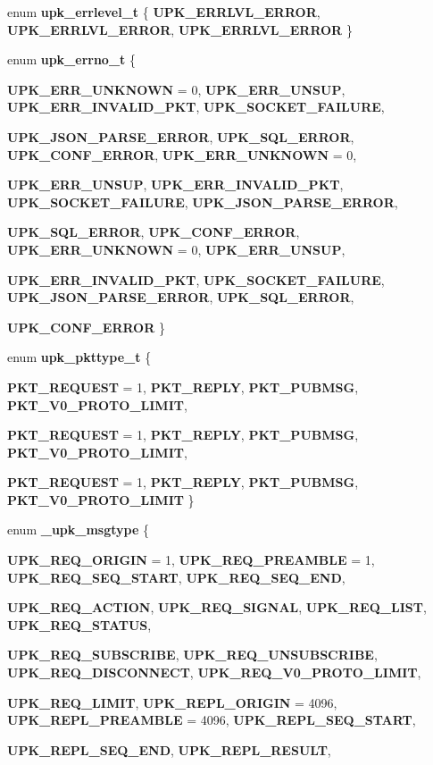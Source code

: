 \begin{DoxyCompactItemize}
enum {\bf upk\_\-errlevel\_\-t} \{ {\bf UPK\_\-ERRLVL\_\-ERROR}, 
{\bf UPK\_\-ERRLVL\_\-ERROR}, 
{\bf UPK\_\-ERRLVL\_\-ERROR}
 \}
\item 
enum {\bf upk\_\-errno\_\-t} \{ \par
{\bf UPK\_\-ERR\_\-UNKNOWN} =  0, 
{\bf UPK\_\-ERR\_\-UNSUP}, 
{\bf UPK\_\-ERR\_\-INVALID\_\-PKT}, 
{\bf UPK\_\-SOCKET\_\-FAILURE}, 
\par
{\bf UPK\_\-JSON\_\-PARSE\_\-ERROR}, 
{\bf UPK\_\-SQL\_\-ERROR}, 
{\bf UPK\_\-CONF\_\-ERROR}, 
{\bf UPK\_\-ERR\_\-UNKNOWN} =  0, 
\par
{\bf UPK\_\-ERR\_\-UNSUP}, 
{\bf UPK\_\-ERR\_\-INVALID\_\-PKT}, 
{\bf UPK\_\-SOCKET\_\-FAILURE}, 
{\bf UPK\_\-JSON\_\-PARSE\_\-ERROR}, 
\par
{\bf UPK\_\-SQL\_\-ERROR}, 
{\bf UPK\_\-CONF\_\-ERROR}, 
{\bf UPK\_\-ERR\_\-UNKNOWN} =  0, 
{\bf UPK\_\-ERR\_\-UNSUP}, 
\par
{\bf UPK\_\-ERR\_\-INVALID\_\-PKT}, 
{\bf UPK\_\-SOCKET\_\-FAILURE}, 
{\bf UPK\_\-JSON\_\-PARSE\_\-ERROR}, 
{\bf UPK\_\-SQL\_\-ERROR}, 
\par
{\bf UPK\_\-CONF\_\-ERROR}
 \}
\item 
enum {\bf upk\_\-pkttype\_\-t} \{ \par
{\bf PKT\_\-REQUEST} =  1, 
{\bf PKT\_\-REPLY}, 
{\bf PKT\_\-PUBMSG}, 
{\bf PKT\_\-V0\_\-PROTO\_\-LIMIT}, 
\par
{\bf PKT\_\-REQUEST} =  1, 
{\bf PKT\_\-REPLY}, 
{\bf PKT\_\-PUBMSG}, 
{\bf PKT\_\-V0\_\-PROTO\_\-LIMIT}, 
\par
{\bf PKT\_\-REQUEST} =  1, 
{\bf PKT\_\-REPLY}, 
{\bf PKT\_\-PUBMSG}, 
{\bf PKT\_\-V0\_\-PROTO\_\-LIMIT}
 \}
\item 
enum {\bf \_\-upk\_\-msgtype} \{ \par
{\bf UPK\_\-REQ\_\-ORIGIN} =  1, 
{\bf UPK\_\-REQ\_\-PREAMBLE} =  1, 
{\bf UPK\_\-REQ\_\-SEQ\_\-START}, 
{\bf UPK\_\-REQ\_\-SEQ\_\-END}, 
\par
{\bf UPK\_\-REQ\_\-ACTION}, 
{\bf UPK\_\-REQ\_\-SIGNAL}, 
{\bf UPK\_\-REQ\_\-LIST}, 
{\bf UPK\_\-REQ\_\-STATUS}, 
\par
{\bf UPK\_\-REQ\_\-SUBSCRIBE}, 
{\bf UPK\_\-REQ\_\-UNSUBSCRIBE}, 
{\bf UPK\_\-REQ\_\-DISCONNECT}, 
{\bf UPK\_\-REQ\_\-V0\_\-PROTO\_\-LIMIT}, 
\par
{\bf UPK\_\-REQ\_\-LIMIT}, 
{\bf UPK\_\-REPL\_\-ORIGIN} =  4096, 
{\bf UPK\_\-REPL\_\-PREAMBLE} =  4096, 
{\bf UPK\_\-REPL\_\-SEQ\_\-START}, 
\par
{\bf UPK\_\-REPL\_\-SEQ\_\-END}, 
{\bf UPK\_\-REPL\_\-RESULT}, 

\end{DoxyCompactItemize}
